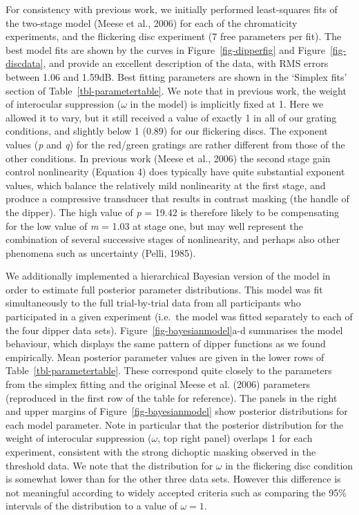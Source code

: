 \documentclass[
  letterpaper,
  DIV=11,
  numbers=noendperiod]{scrartcl}
\begin{document}
For consistency with previous work, we initially performed least-squares
fits of the two-stage model (Meese et al., 2006) for each of the
chromaticity experiments, and the flickering disc experiment (7 free
parameters per fit). The best model fits are shown by the curves in
Figure~\ref{fig-dipperfig} and Figure~\ref{fig-discdata}, and provide an
excellent description of the data, with RMS errors between 1.06 and
1.59dB. Best fitting parameters are shown in the `Simplex fits' section
of Table~\ref{tbl-parametertable}. We note that in previous work, the
weight of interocular suppression (\(\omega\) in the model) is
implicitly fixed at 1. Here we allowed it to vary, but it still received
a value of exactly 1 in all of our grating conditions, and slightly
below 1 (0.89) for our flickering discs. The exponent values (\emph{p}
and \emph{q}) for the red/green gratings are rather different from those
of the other conditions. In previous work (Meese et al., 2006) the
second stage gain control nonlinearity (Equation 4) does typically have
quite substantial exponent values, which balance the relatively mild
nonlinearity at the first stage, and produce a compressive transducer
that results in contrast masking (the handle of the dipper). The high
value of \emph{p} = 19.42 is therefore likely to be compensating for the
low value of \emph{m} = 1.03 at stage one, but may well represent the
combination of several successive stages of nonlinearity, and perhaps
also other phenomena such as uncertainty (Pelli, 1985).

We additionally implemented a hierarchical Bayesian version of the model
in order to estimate full posterior parameter distributions. This model
was fit simultaneously to the full trial-by-trial data from all
participants who participated in a given experiment (i.e.~the model was
fitted separately to each of the four dipper data sets).
Figure~\ref{fig-bayesianmodel}a-d summarises the model behaviour, which
displays the same pattern of dipper functions as we found empirically.
Mean posterior parameter values are given in the lower rows of
Table~\ref{tbl-parametertable}. These correspond quite closely to the
parameters from the simplex fitting and the original Meese et al. (2006)
parameters (reproduced in the first row of the table for reference). The
panels in the right and upper margins of Figure~\ref{fig-bayesianmodel}
show posterior distributions for each model parameter. Note in
particular that the posterior distribution for the weight of interocular
suppression (\(\omega\), top right panel) overlaps 1 for each
experiment, consistent with the strong dichoptic masking observed in the
threshold data. We note that the distribution for \(\omega\) in the
flickering disc condition is somewhat lower than for the other three
data sets. However this difference is not meaningful according to widely
accepted criteria such as comparing the 95\% intervals of the
distribution to a value of \(\omega=1\).
\end{document}

